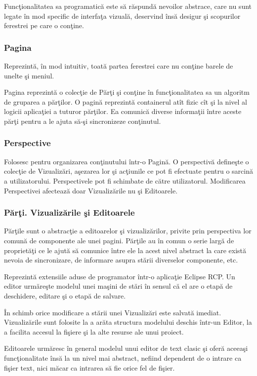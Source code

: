 Funcţionalitatea sa programatică este să răspundă nevoilor abstrace, care nu
sunt legate în mod specific de interfaţa vizuală, deservind însă desigur şi
scopurilor ferestrei pe care o conţine.

\subsubsection{Pagina}
Reprezintă, în mod intuitiv,  toată partea ferestrei care nu conţine barele de 
unelte şi meniul.

Pagina reprezintă o colecţie de Părţi şi conţine în funcţionalitatea sa un
algoritm de gruparea a părţilor. O pagină reprezintă containerul atît fizic cît
şi la nivel al logicii aplicaţiei a tuturor părţilor. Ea comunică diverse
informaţii între aceste părţi pentru a le ajuta să-şi sincronizeze conţinutul.

\subsubsection{Perspective}
Folosesc pentru organizarea conţinutului într-o Pagină. O perspectivă defineşte 
o colecţie de Vizualizări, aşezarea lor şi acţiunile ce pot fi efectuate pentru 
o sarcină a utilizatorului. Perspectivele pot fi schimbate de către 
utilizatorul. Modificarea Perspectivei afectează doar Vizualizările nu şi 
Editoarele. \cite{eclipsehelp}

\subsubsection{Părţi. Vizualizările şi Editoarele}
Părţile sunt o abstracţie a editoarelor şi vizualizărilor, privite prin
perspectiva lor comună de componente ale unei pagini. Părţile au în comun o
serie largă de proprietăţi ce le ajută să comunice între ele la acest nivel
abstract la care există nevoia de sincronizare, de informare asupra stării
diverselor componente, etc.

Reprezintă extensiile aduse de programator într-o aplicaţie Eclipse RCP. Un 
editor urmăreşte modelul unei maşini de stări în sensul că el are o etapă de 
deschidere, editare şi o etapă de salvare.

În schimb orice modificare a stării unei Vizualizări este salvată imediat. 
Vizualizările sunt folosite la a arăta structura modelului deschis într-un 
Editor, la a facilita accesul la fişiere şi la alte resurse ale unui proiect.

Editoarele urmăresc în general modelul unui editor de text clasic şi oferă 
aceeaşi funcţionalitate însă la un nivel mai abstract, nefiind dependent de o 
intrare ca fişier text, nici măcar ca intrarea să fie orice fel de fişier.

